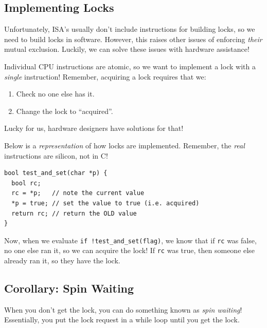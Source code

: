 \documentclass{report}
\newcommand{\exampleBegin}[1]{\begin{tcolorbox}[colback=blue!5!white,colframe=black!75!blue,title={Example:
      #1}]}
\newcommand{\exampleEnd}{\end{tcolorbox}}
\begin{document}
\subsection*{Implementing Locks}
Unfortunately, ISA's usually don't include instructions for building locks, so we need to build
locks in software. However, this raises other issues of enforcing \textit{their} mutual
exclusion. Luckily, we can solve these issues with hardware assistance!

Individual CPU instructions are atomic, so we want to implement a lock with a \textit{single}
instruction! Remember, acquiring a lock requires that we:
\begin{enumerate}[label=\textit{(\roman*)}]
\item Check no one else has it.
\item Change the lock to ``acquired''.
\end{enumerate}
Lucky for us, hardware designers have solutions for that!


\exampleBegin{Test and Set}
Below is a \textit{representation} of how locks are implemented. Remember, the \textit{real}
instructions are silicon, not in C!

\begin{verbatim}
bool test_and_set(char *p) {
  bool rc;
  rc = *p;   // note the current value
  *p = true; // set the value to true (i.e. acquired)
  return rc; // return the OLD value
}
\end{verbatim}
Now, when we evaluate \texttt{if !test\_and\_set(flag)}, we know that if \texttt{rc} was false, no
one else ran it, so we can acquire the lock! If \texttt{rc} was true, then someone else already ran
it, so they have the lock.
\exampleEnd

\subsection*{Corollary: Spin Waiting}
When you don't get the lock, you can do something known as \textit{spin waiting}! Essentially, you
put the lock request in a while loop until you get the lock.
\end{document}
